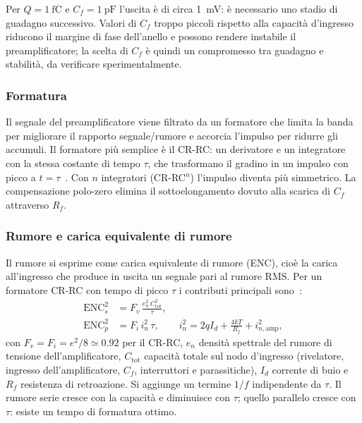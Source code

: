 \documentclass[11pt,a4paper]{article}
\begin{document}
Per $Q=\SI{1}{\femto\coulomb}$ e $C_f=\SI{1}{\pico\farad}$ l'uscita è di circa \SI{1}{\milli\volt}: è necessario uno stadio di guadagno successivo. Valori di $C_f$ troppo piccoli rispetto alla capacità d'ingresso riducono il margine di fase dell'anello e possono rendere instabile il preamplificatore; la scelta di $C_f$ è quindi un compromesso tra guadagno e stabilità, da verificare sperimentalmente.

\subsubsection{Formatura}

Il segnale del preamplificatore viene filtrato da un formatore che limita la banda per migliorare il rapporto segnale/rumore e accorcia l'impulso per ridurre gli accumuli. Il formatore più semplice è il CR-RC: un derivatore e un integratore con la stessa costante di tempo $\tau$, che trasformano il gradino in un impulso con picco a $t=\tau$~\cite{knoll2010,spieler2005}. Con $n$ integratori (CR-RC$^n$) l'impulso diventa più simmetrico. La compensazione polo-zero elimina il sottoelongamento dovuto alla scarica di $C_f$ attraverso $R_f$.

\subsubsection{Rumore e carica equivalente di rumore}

Il rumore si esprime come carica equivalente di rumore (ENC), cioè la carica all'ingresso che produce in uscita un segnale pari al rumore RMS. Per un formatore CR-RC con tempo di picco $\tau$ i contributi principali sono~\cite{radeka1988,spieler2005}:
\begin{align}
  \mathrm{ENC}_{s}^2 &= F_v\,\frac{e_n^2\,C_{\mathrm{tot}}^2}{\tau}, \label{eq:encs}\\
  \mathrm{ENC}_{p}^2 &= F_i\,i_n^2\,\tau, \qquad i_n^2 = 2qI_d + \frac{4kT}{R_f} + i_{n,\mathrm{amp}}^2, \label{eq:encp}
\end{align}
con $F_v = F_i = e^2/8 \simeq 0.92$ per il CR-RC, $e_n$ densità spettrale del rumore di tensione dell'amplificatore, $C_{\mathrm{tot}}$ capacità totale sul nodo d'ingresso (rivelatore, ingresso dell'amplificatore, $C_f$, interruttori e parassitiche), $I_d$ corrente di buio e $R_f$ resistenza di retroazione. Si aggiunge un termine $1/f$ indipendente da $\tau$. Il rumore serie cresce con la capacità e diminuisce con $\tau$; quello parallelo cresce con $\tau$: esiste un tempo di formatura ottimo.
\end{document}
